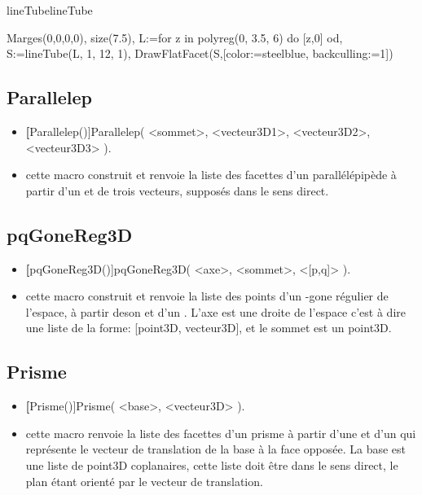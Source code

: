 \begin{demo}{lineTube}{lineTube}
\begin{texgraph}[name=lineTube]
Marges(0,0,0,0), size(7.5),
L:=for z in polyreg(0, 3.5, 6) 
  do [z,0] od,
S:=lineTube(L, 1, 12, 1),
DrawFlatFacet(S,[color:=steelblue,
         backculling:=1])
\end{texgraph}
\end{demo}

\subsection{Parallelep}
\begin{itemize}
 \item \util \textbf[Parallelep()]{Parallelep( <sommet>, <vecteur3D1>, <vecteur3D2>, <vecteur3D3> )}.
 \item \desc cette macro construit et renvoie la liste des facettes d'un parallélépipède à partir d'un  et de trois vecteurs, supposés dans le sens direct.
\end{itemize}

\subsection{pqGoneReg3D}
\begin{itemize}
 \item \util \textbf[pqGoneReg3D()]{pqGoneReg3D( <axe>, <sommet>, <[p,q]> )}.
 \item \desc cette macro construit et renvoie la liste des points d'un -gone régulier de l'espace, à partir deson  et d'un . L'axe est une droite de l'espace c'est à dire une liste de la forme: [point3D, vecteur3D], et le sommet est un point3D.
\end{itemize}

\subsection{Prisme}
\begin{itemize}
 \item \util \textbf[Prisme()]{Prisme( <base>, <vecteur3D> )}.
 \item \desc cette macro renvoie la liste des facettes d'un prisme à partir d'une  et d'un  qui représente le vecteur de translation de la base à la face opposée. La base est une liste de point3D coplanaires, cette liste doit être dans le sens direct, le plan étant orienté par le vecteur de translation. 
\end{itemize}

